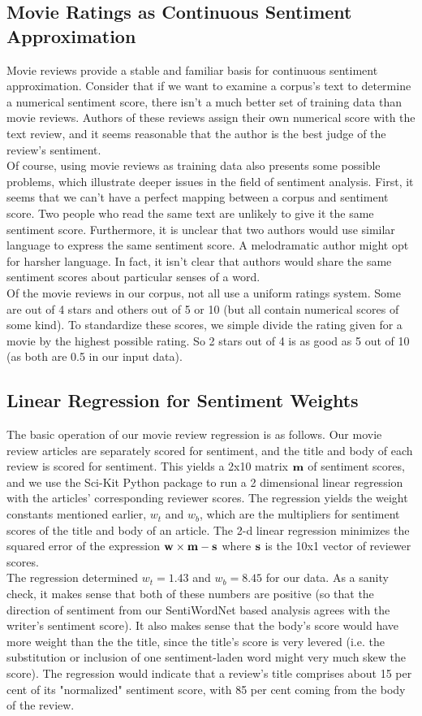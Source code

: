 \documentclass[pageno]{jpaper}
\begin{document}
\subsection{Movie Ratings as Continuous Sentiment Approximation}
\indent Movie reviews provide a stable and familiar basis for continuous sentiment approximation. Consider that if we want to examine a corpus's text to determine a numerical sentiment score, there isn't a much better set of training data than movie reviews. Authors of these reviews assign their own numerical score with the text review, and it seems reasonable that the author is the best judge of the review's sentiment. \\
\indent Of course, using movie reviews as training data also presents some possible problems, which illustrate deeper issues in the field of sentiment analysis. First, it seems that we can't have a perfect mapping between a corpus and sentiment score. Two people who read the same text are unlikely to give it the same sentiment score. Furthermore, it is unclear that two authors would use similar language to express the same sentiment score. A melodramatic author might opt for harsher language. In fact, it isn't clear that authors would share the same sentiment scores about particular senses of a word. \\
\indent Of the movie reviews in our corpus, not all use a uniform ratings system. Some are out of 4 stars and others out of 5 or 10 (but all contain numerical scores of some kind). To standardize these scores, we simple divide the rating given for a movie by the highest possible rating. So 2 stars out of 4 is as good as 5 out of 10 (as both are 0.5 in our input data).
\subsection{Linear Regression for Sentiment Weights}
The basic operation of our movie review regression is as follows. Our movie review articles are separately scored for sentiment, and the title and body of each review is scored for sentiment. This yields a 2x10 matrix ${\bf m}$ of sentiment scores, and we use the Sci-Kit Python package to run a 2 dimensional linear regression with the articles' corresponding reviewer scores. The regression yields the weight constants mentioned earlier, $w_t$ and $w_b$, which are the multipliers for sentiment scores of the title and body of an article. The 2-d linear regression minimizes the squared error of the expression ${\bf w \times m - s}$ where ${\bf s}$ is the 10x1 vector of reviewer scores. \\
\indent The regression determined $w_t = 1.43$ and $w_b = 8.45$ for our data. As a sanity check, it makes sense that both of these numbers are positive (so that the direction of sentiment from our SentiWordNet based analysis agrees with the writer's sentiment score). It also makes sense that the body's score would have more weight than the the title, since the title's score is very levered (i.e. the substitution or inclusion of one sentiment-laden word might very much skew the score). The regression would indicate that a review's title comprises about 15 per cent of its "normalized" sentiment score, with 85 per cent coming from the body of the review.
\end{document}
